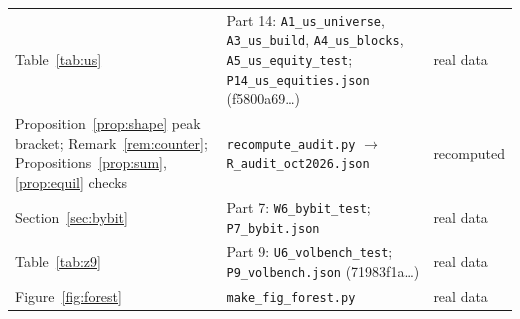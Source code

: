 \begin{longtable}{p{}p{}p{}}
Table~\ref{tab:us} & Part 14: \texttt{A1\_us\_universe}, \texttt{A3\_us\_build}, \texttt{A4\_us\_blocks}, \texttt{A5\_us\_equity\_test}; \texttt{P14\_us\_equities.json} (f5800a69\ldots) & real data\\
Proposition~\ref{prop:shape} peak bracket; Remark~\ref{rem:counter}; Propositions~\ref{prop:sum}, \ref{prop:equil} checks & \texttt{recompute\_audit.py} $\to$ \texttt{R\_audit\_oct2026.json} & recomputed\\
Section~\ref{sec:bybit} & Part 7: \texttt{W6\_bybit\_test}; \texttt{P7\_bybit.json} & real data\\
Table~\ref{tab:z9} & Part 9: \texttt{U6\_volbench\_test}; \texttt{P9\_volbench.json} (71983f1a\ldots) & real data\\
Figure~\ref{fig:forest} & \texttt{make\_fig\_forest.py} & real data\\
\bottomrule
\end{longtable}




